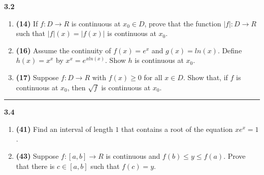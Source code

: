 \documentclass[fleqn]{article}
\begin{document}
  \textbf{3.2}
  \begin{enumerate}
    \item \textbf{(14)} If $f: D \longrightarrow R$ is continuous at $x_0 \in D$, prove that the function $|f|: D \longrightarrow R$
    such that $|f|(x)=|f(x)|$ is continuous at $x_0$.

        


    \item \textbf{(16)} Assume the continuity of $f(x)=e^x$ and $g(x)=ln(x)$. Define $h(x)=x^x$ by $x^x=e^{x ln(x)}$. Show $h$ is continuous
    at $x_0$.

        
    

    \item \textbf{(17)} Suppose $f: D \longrightarrow R$ with $f(x) \geq 0$ for all $x \in D$. Show that, if $f$ is continuous at $x_0$, then
    $\sqrt{f}$ is continuous at $x_0$.

        

  \end{enumerate}

  \rule{15cm}{2pt}

  \textbf{3.4}
  \begin{enumerate}
    \item \textbf{(41)} Find an interval of length $1$ that contains a root of the equation $x e^x=1$.

        


    \item \textbf{(43)} Suppose $f: [a, b] \longrightarrow R$ is continuous and $f(b) \leq y \leq f(a)$. Prove that there is
    $c \in [a, b]$ such that $f(c)=y$.

        
    
  \end{enumerate}
\end{document}
